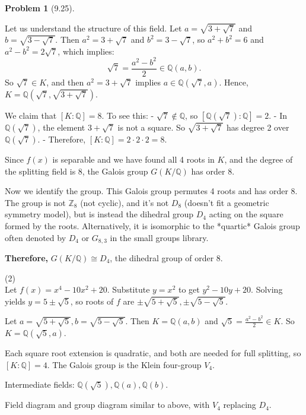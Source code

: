 \documentclass[12pt]{article}
\theoremstyle{definition}
\newtheorem{problem}{Problem}
\begin{document}
\begin{problem}[9.25]
\begin{enumerate}[label=(\alph*)]
\begin{solution}
            Let us understand the structure of this field. Let $a = \sqrt{3 + \sqrt{7}}$ and $b = \sqrt{3 - \sqrt{7}}$. Then $a^2 = 3 + \sqrt{7}$ and $b^2 = 3 - \sqrt{7}$, so $a^2 + b^2 = 6$ and $a^2 - b^2 = 2\sqrt{7}$, which implies:
            \[
            \sqrt{7} = \frac{a^2 - b^2}{2} \in \mathbb{Q}(a,b).
            \]
            So $\sqrt{7} \in K$, and then $a^2 = 3 + \sqrt{7}$ implies $a \in \mathbb{Q}(\sqrt{7}, a)$. Hence, $K = \mathbb{Q}(\sqrt{7}, \sqrt{3 + \sqrt{7}})$.

            We claim that $[K : \mathbb{Q}] = 8$. To see this:
            - $\sqrt{7} \not\in \mathbb{Q}$, so $[\mathbb{Q}(\sqrt{7}) : \mathbb{Q}] = 2$.
            - In $\mathbb{Q}(\sqrt{7})$, the element $3 + \sqrt{7}$ is not a square. So $\sqrt{3 + \sqrt{7}}$ has degree 2 over $\mathbb{Q}(\sqrt{7})$.
            - Therefore, $[K : \mathbb{Q}] = 2 \cdot 2 \cdot 2 = 8$.

            Since $f(x)$ is separable and we have found all 4 roots in $K$, and the degree of the splitting field is 8, the Galois group $G(K/\mathbb{Q})$ has order 8.

            Now we identify the group. This Galois group permutes 4 roots and has order 8. The group is not $\mathbb{Z}_8$ (not cyclic), and it's not $D_8$ (doesn’t fit a geometric symmetry model), but is instead the dihedral group $D_4$ acting on the square formed by the roots. Alternatively, it is isomorphic to the *quartic* Galois group often denoted by $D_4$ or $G_{8,3}$ in the small groups library.

            \textbf{Therefore, } $G(K/\mathbb{Q}) \cong D_4$, the dihedral group of order 8.

            (2)\\
            Let $f(x) = x^4 - 10x^2 + 20$. Substitute $y = x^2$ to get $y^2 - 10y + 20$. Solving yields $y = 5 \pm \sqrt{5}$, so roots of $f$ are $\pm \sqrt{5 + \sqrt{5}}, \pm \sqrt{5 - \sqrt{5}}$.

            Let $a = \sqrt{5 + \sqrt{5}}, b = \sqrt{5 - \sqrt{5}}$. Then $K = \mathbb{Q}(a, b)$ and $\sqrt{5} = \frac{a^2 - b^2}{2} \in K$. So $K = \mathbb{Q}(\sqrt{5}, a)$. 

            Each square root extension is quadratic, and both are needed for full splitting, so $[K : \mathbb{Q}] = 4$. The Galois group is the Klein four-group $V_4$.

            Intermediate fields: $\mathbb{Q}(\sqrt{5}), \mathbb{Q}(a), \mathbb{Q}(b)$.

            Field diagram and group diagram similar to above, with $V_4$ replacing $D_4$.


\end{solution}
\end{enumerate}
\end{problem}
\end{document}
